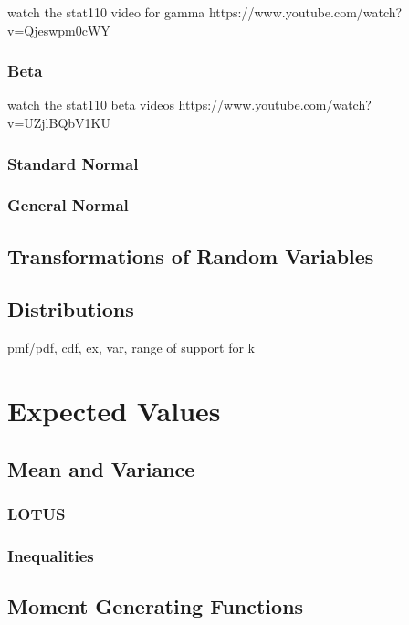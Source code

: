\documentclass[a4paper,10pt]{article}
\begin{document}
{\huge watch the stat110 video for gamma https://www.youtube.com/watch?v=Qjeswpm0cWY}

\subsubsection{Beta}

{\huge watch the stat110 beta videos https://www.youtube.com/watch?v=UZjlBQbV1KU}

\subsubsection{Standard Normal}

\subsubsection{General Normal}

\subsection{Transformations of Random Variables}

\subsection{Distributions}
pmf/pdf, cdf, ex, var, range of support for k


\newpage
\section{Expected Values}

\subsection{Mean and Variance}
\subsubsection{LOTUS}
\subsubsection{Inequalities}

\subsection{Moment Generating Functions}
\end{document}
